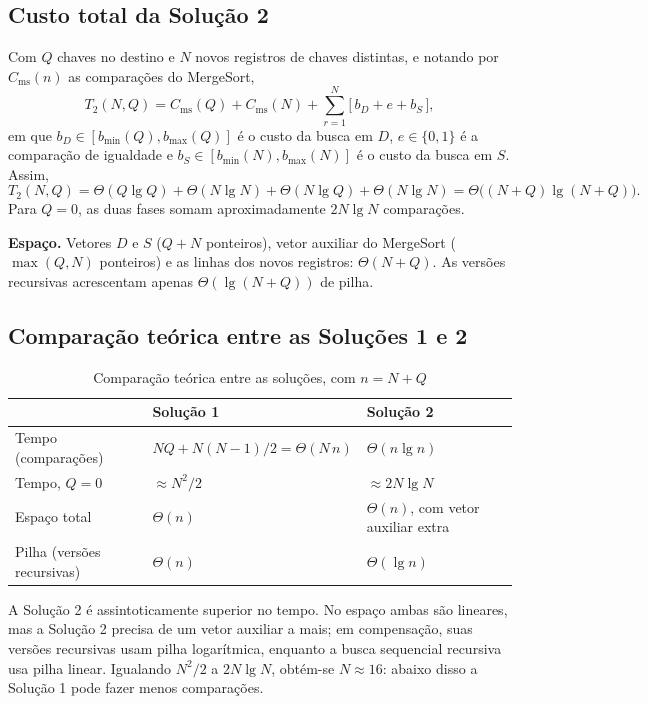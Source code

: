 \documentclass[11pt,a4paper]{article}
\begin{document}
\subsection{Custo total da Solução 2}

Com $Q$ chaves no destino e $N$ novos registros de chaves distintas, e notando por $C_{\text{ms}}(n)$ as comparações do MergeSort,
\[
T_2(N,Q)=C_{\text{ms}}(Q)+C_{\text{ms}}(N)+\sum_{r=1}^{N}\big[\,b_D+e+b_S\,\big],
\]
em que $b_D\in[b_{\min}(Q),b_{\max}(Q)]$ é o custo da busca em $D$, $e\in\{0,1\}$ é a comparação de igualdade e $b_S\in[b_{\min}(N),b_{\max}(N)]$ é o custo da busca em $S$. Assim,
\[
T_2(N,Q)=\Theta(Q\lg Q)+\Theta(N\lg N)+\Theta(N\lg Q)+\Theta(N\lg N)=\Theta\big((N+Q)\lg(N+Q)\big).
\]
Para $Q=0$, as duas fases somam aproximadamente $2N\lg N$ comparações.

\textbf{Espaço.} Vetores $D$ e $S$ ($Q+N$ ponteiros), vetor auxiliar do MergeSort ($\max(Q,N)$ ponteiros) e as linhas dos novos registros: $\Theta(N+Q)$. As versões recursivas acrescentam apenas $\Theta(\lg(N+Q))$ de pilha.

\subsection{Comparação teórica entre as Soluções 1 e 2}

\begin{table}[H]
\centering
\caption{Comparação teórica entre as soluções, com $n=N+Q$}
\begin{tabular}{lll}
\toprule
 & Solução 1 & Solução 2 \\
\midrule
Tempo (comparações) & $NQ+N(N-1)/2=\Theta(N\,n)$ & $\Theta(n\lg n)$ \\
Tempo, $Q=0$ & $\approx N^2/2$ & $\approx 2N\lg N$ \\
Espaço total & $\Theta(n)$ & $\Theta(n)$, com vetor auxiliar extra \\
Pilha (versões recursivas) & $\Theta(n)$ & $\Theta(\lg n)$ \\
\bottomrule
\end{tabular}
\end{table}

A Solução 2 é assintoticamente superior no tempo. No espaço ambas são lineares, mas a Solução 2 precisa de um vetor auxiliar a mais; em compensação, suas versões recursivas usam pilha logarítmica, enquanto a busca sequencial recursiva usa pilha linear. Igualando $N^2/2$ a $2N\lg N$, obtém-se $N\approx16$: abaixo disso a Solução 1 pode fazer menos comparações.
\end{document}
